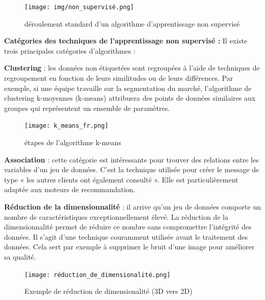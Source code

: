      \begin{figure}[htbp]
     \centering    
     \texttt{[image: img/non\_supervisé.png]}
     \caption{déroulement standard d'un algorithme d'apprentissage non supervisé \cite{apprentissage_supervise_definition}}
     \label{fig:example4}
     \end{figure}



\textbf{Catégories des techniques de l'apprentissage non supervisé :}
 Il existe trois principales catégories d'algorithmes \cite{supervised_vs_unsupervised_learning}:
 
 \textbf{Clustering} : les données non étiquetées sont regroupées à l'aide de techniques de regroupement en fonction de leurs similitudes ou de leurs différences. Par exemple, si une équipe travaille sur la segmentation du marché, l'algorithme de clustering k-moyennes (k-means) attribuera des points de données similaires aux groupes qui représentent un ensemble de paramètres.

 \begin{figure}[htbp]
     \centering    
     \texttt{[image: k\_means\_fr.png]}
     \caption{étapes de l'algorithme k-means \cite{pense_bete_apprentissage_non_supervise}}
     \label{fig:example5}
     \end{figure}


\textbf{Association} : cette catégorie est intéressante pour trouver des relations entre les variables d'un jeu de données. C'est la technique utilisée pour créer le message de type « les autres clients ont également consulté ». Elle est particulièrement adaptée aux moteurs de recommandation. 

\vspace{1cm}

\textbf{Réduction de la dimensionnalité} : il arrive qu'un jeu de données comporte un nombre de caractéristiques exceptionnellement élevé. La réduction de la dimensionnalité permet de réduire ce nombre sans compromettre l'intégrité des données. Il s'agit d'une technique couramment utilisée avant le traitement des données. Cela sert par exemple à supprimer le bruit d'une image pour améliorer sa qualité.


\begin{figure}[htbp]
     \centering    
     \texttt{[image: réduction\_de\_dimensionalité.png]}
     \caption{Exemple de réduction de dimensionalité (3D vers 2D) \cite{reduction_de_dimensionalite}}
     \label{fig:example6}
     \end{figure}

